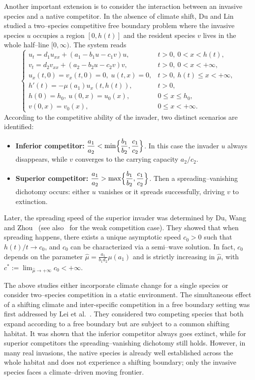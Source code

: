 \documentclass[reqno]{amsart}
\theoremstyle{plain}
\theoremstyle{definition}
\theoremstyle{remark}
\begin{document}
	Another important extension is to consider the interaction between an invasive species and a native competitor. In the absence of climate shift, Du and Lin~\cite{MR3327894} studied a two–species competitive free boundary problem where the invasive species $u$ occupies a region $[0,h(t)]$ and the resident species $v$ lives in the whole half–line $[0,\infty)$. The system reads
	\begin{equation}\label{main2}
	\begin{cases}
		u_t = d_1u_{xx} + (a_1 - b_1u - c_1 v) u, & t > 0,~ 0 < x < h(t), \\
		v_t = d_2v_{xx} + (a_2 - b_2u - c_2v)v,   & t > 0,~ 0 < x < +\infty, \\
		u_x(t, 0) = v_x(t, 0) = 0, \; u(t, x) = 0, & t > 0, ~ h(t) \leq x < +\infty, \\
		h'(t) = -\mu(a_1)u_x(t, h(t)),            & t > 0, \\
		h(0)=h_0,~ u(0, x) = u_0(x),             & 0 \leq x \leq h_0, \\
		v(0, x) = v_0(x),                         & 0 \le x < +\infty.
	\end{cases}
	\end{equation}
	According to the competitive ability of the invader, two distinct scenarios are identified:
	\begin{itemize}
		\item \textbf{Inferior competitor:} $\displaystyle\frac{a_1}{a_2} < \min\Bigl\{\frac{b_1}{b_2},\frac{c_1}{c_2}\Bigr\}$. In this case the invader $u$ always disappears, while $v$ converges to the carrying capacity $a_2/c_2$.
		\item \textbf{Superior competitor:} $\displaystyle\frac{a_1}{a_2} > \max\Bigl\{\frac{b_1}{b_2},\frac{c_1}{c_2}\Bigr\}$. Then a spreading–vanishing dichotomy occurs: either $u$ vanishes or it spreads successfully, driving $v$ to extinction.
	\end{itemize}
	Later, the spreading speed of the superior invader was determined by Du, Wang and Zhou~\cite{MR3609207} (see also~\cite{MR3986328} for the weak competition case). They showed that when spreading happens, there exists a unique asymptotic speed $c_0>0$ such that $h(t)/t \to c_0$, and $c_0$ can be characterized via a semi–wave solution. In fact, $c_0$ depends on the parameter $\hat\mu = \frac{a_1}{b_1d_2}\mu(a_1)$ and is strictly increasing in $\hat\mu$, with $c^* := \lim_{\hat\mu\to+\infty}c_0 < +\infty$.
	
	The above studies either incorporate climate change for a single species or consider two–species competition in a static environment. The simultaneous effect of a shifting climate and inter-specific competition in a free boundary setting was first addressed by Lei et al.~\cite{Lei2018}. They considered two competing species that both expand according to a free boundary but are subject to a common shifting habitat. It was shown that the inferior competitor always goes extinct, while for superior competitors the spreading–vanishing dichotomy still holds. However, in many real invasions, the native species is already well established across the whole habitat and does not experience a shifting boundary; only the invasive species faces a climate–driven moving frontier.
	
\end{document}
